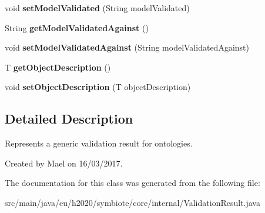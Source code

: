 \begin{DoxyCompactItemize}
void {\bfseries set\+Model\+Validated} (String model\+Validated)
\item 
\mbox{\label{classeu_1_1h2020_1_1symbiote_1_1core_1_1internal_1_1ValidationResult_adcfdfe0d86562b4e82b53ff024b6edf5}} 
String {\bfseries get\+Model\+Validated\+Against} ()
\item 
\mbox{\label{classeu_1_1h2020_1_1symbiote_1_1core_1_1internal_1_1ValidationResult_a6e870ed873ce4026964cf59f66558faf}} 
void {\bfseries set\+Model\+Validated\+Against} (String model\+Validated\+Against)
\item 
\mbox{\label{classeu_1_1h2020_1_1symbiote_1_1core_1_1internal_1_1ValidationResult_a221e7e9dff9dfc1310934e3345a27f5d}} 
T {\bfseries get\+Object\+Description} ()
\item 
\mbox{\label{classeu_1_1h2020_1_1symbiote_1_1core_1_1internal_1_1ValidationResult_aac47002afd794466d76d35cf39eac0e3}} 
void {\bfseries set\+Object\+Description} (T object\+Description)
\end{DoxyCompactItemize}


\subsection{Detailed Description}
Represents a generic validation result for ontologies.

Created by Mael on 16/03/2017. 

The documentation for this class was generated from the following file\+:\begin{DoxyCompactItemize}
\item 
src/main/java/eu/h2020/symbiote/core/internal/Validation\+Result.\+java\end{DoxyCompactItemize}
